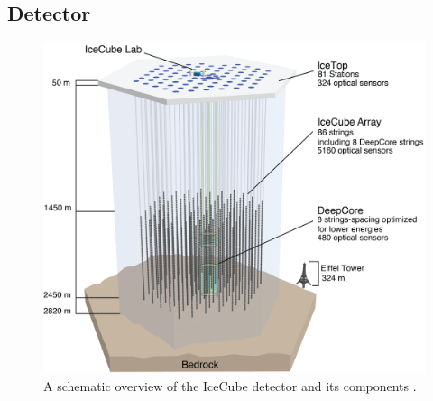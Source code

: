 \subsection{Detector}
\label{sec:IC_coordinate}
\begin{figure}
	\centering \includegraphics{./figures/nu_in_icecube/IceCubeArray_slim.png}
	\caption[The IceCube Neutrino Observatory]{A schematic overview of the IceCube detector and its components \cite{Aartsen_2017}.}
\end{figure}
    
